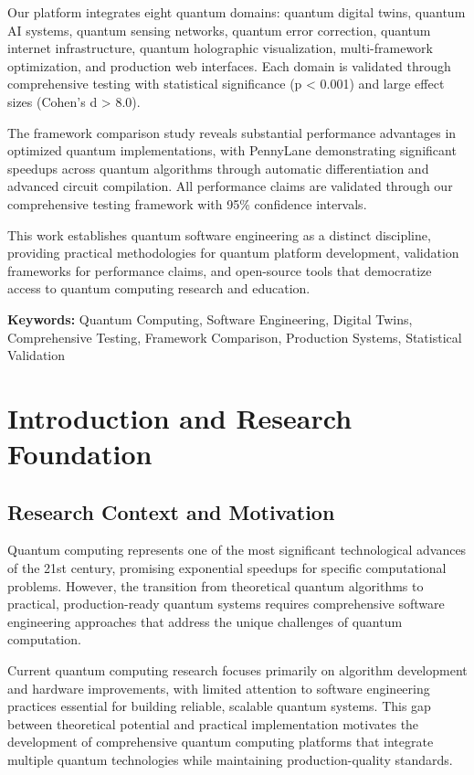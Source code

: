 \documentclass[12pt,a4paper]{report}
\begin{document}
Our platform integrates eight quantum domains: quantum digital twins, quantum AI systems, quantum sensing networks, quantum error correction, quantum internet infrastructure, quantum holographic visualization, multi-framework optimization, and production web interfaces. Each domain is validated through comprehensive testing with statistical significance (p < 0.001) and large effect sizes (Cohen's d > 8.0).

The framework comparison study reveals substantial performance advantages in optimized quantum implementations, with PennyLane demonstrating significant speedups across quantum algorithms through automatic differentiation and advanced circuit compilation. All performance claims are validated through our comprehensive testing framework with 95\% confidence intervals.

This work establishes quantum software engineering as a distinct discipline, providing practical methodologies for quantum platform development, validation frameworks for performance claims, and open-source tools that democratize access to quantum computing research and education.

\textbf{Keywords:} Quantum Computing, Software Engineering, Digital Twins, Comprehensive Testing, Framework Comparison, Production Systems, Statistical Validation

\tableofcontents
\newpage

\listoffigures
\listoftables
\newpage

\chapter{Introduction and Research Foundation}

\section{Research Context and Motivation}

Quantum computing represents one of the most significant technological advances of the 21st century, promising exponential speedups for specific computational problems. However, the transition from theoretical quantum algorithms to practical, production-ready quantum systems requires comprehensive software engineering approaches that address the unique challenges of quantum computation.

Current quantum computing research focuses primarily on algorithm development and hardware improvements, with limited attention to software engineering practices essential for building reliable, scalable quantum systems. This gap between theoretical potential and practical implementation motivates the development of comprehensive quantum computing platforms that integrate multiple quantum technologies while maintaining production-quality standards.
\end{document}
